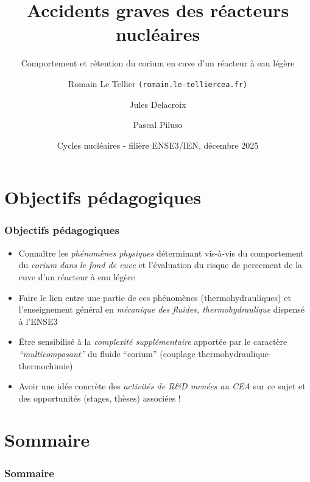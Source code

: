 \documentclass[usenames,dvipsnames,aspectratio=169, 10pt]{beamer}
\title[Rétention du corium en cuve]  %
{Accidents graves des réacteurs nucléaires}
\subtitle{Comportement et rétention du corium en cuve d'un réacteur à eau légère}
\date[Décembre 2025]  %
{Cycles nucléaires - filière ENSE3/IEN, décembre 2025}
\author[Romain Le Tellier]  %
{Romain Le Tellier \texttt{(\small romain.le-tellier\myat cea.fr)} \and Jules Delacroix \and Pascal Piluso}
\institute[CEA IRESNE]  %
{CEA, DES, IRESNE, DTN, Cadarache}
\renewcommand{\emph}[1]{\textcolor{ceared}{\textit{#1}}}
\begin{document}
\begin{frame}[decorated] %
  \titlepage
\end{frame}

\section{Objectifs pédagogiques}
\begin{frame}[fragile]
\frametitle{Objectifs pédagogiques}
\begin{itemize}
\item Connaître les \emph{phénomènes physiques} déterminant vis-à-vis du comportement du \emph{corium dans le fond de cuve} et l'évaluation du risque de percement de la cuve d'un réacteur à eau légère
\item Faire le lien entre une partie de ces phénomènes (thermohydrauliques) et l'enseignement général en \emph{mécanique des fluides, thermohydraulique} dispensé à l'ENSE3
\item Être sensibilisé à la \emph{complexité supplémentaire} apportée par le caractère \emph{``multicomposant''} du fluide ``corium'' (couplage thermohydraulique-thermochimie)
\item Avoir une idée concrète des \emph{activités de R\&D menées au CEA} sur ce sujet et des opportunités (stages, thèses) associées !
\end{itemize}
\end{frame}

\section*{Sommaire}
\begin{frame}[fragile]
\frametitle{Sommaire}
  \linespread{0.9}
  \tableofcontents[sectionstyle=hide/show, subsectionstyle=hide/show/show,sections={2-}, firstsection=2]
  \linespread{1}
\end{frame}





\end{document}
